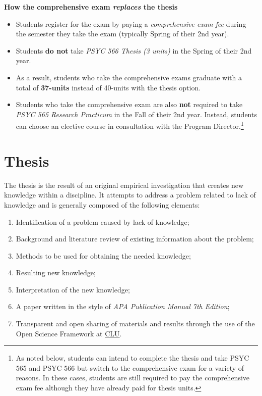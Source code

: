 \documentclass[openany]{book}
\providecommand{\tightlist}{%
  \setlength{\itemsep}{0pt}\setlength{\parskip}{0pt}}
\begin{document}
\textbf{How the comprehensive exam \emph{replaces} the thesis}

\begin{itemize}
\tightlist
\item
  Students register for the exam by paying a \emph{comprehensive exam fee} during the semester they take the exam (typically Spring of their 2nd year).
\item
  Students \textbf{do not} take \emph{PSYC 566 Thesis (3 units)} in the Spring of their 2nd year.\\
\item
  As a result, students who take the comprehensive exams graduate with a total of \textbf{37-units}
  instead of 40-units with the thesis option.
\item
  Students who take the comprehensive exam are also \textbf{not} required to take \emph{PSYC 565 Research Practicum} in the Fall of their 2nd year. Instead, students can choose an elective course in consultation with the Program Director.\footnote{As noted below, students can intend to complete the thesis and take PSYC 565 and PSYC 566 but switch to the comprehensive exam for a variety of reasons. In these cases, students are still required to pay the comprehensive exam fee although they have already paid for thesis units.}
\end{itemize}

\hypertarget{thesis}{%
\section{Thesis}\label{thesis}}

The thesis is the result of an original empirical investigation that creates new knowledge within a discipline. It attempts to address a problem related to lack of knowledge and is generally composed of the following elements:

\begin{enumerate}
\def\labelenumi{\arabic{enumi}.}
\tightlist
\item
  Identification of a problem caused by lack of knowledge;
\item
  Background and literature review of existing information about the problem;
\item
  Methods to be used for obtaining the needed knowledge;
\item
  Resulting new knowledge;
\item
  Interpretation of the new knowledge;
\item
  A paper written in the style of \emph{APA Publication Manual 7th Edition};
\item
  Transparent and open sharing of materials and results through the use of the Open Science Framework at \href{https://accounts.osf.io/login?campaign=institution\&service=https\%3A\%2F\%2Fosf.io\%2Flogin\%2F\%3Fnext\%3Dhttps\%253A\%252F\%252Fosf.io\%252F}{CLU}.
\end{enumerate}
\end{document}
